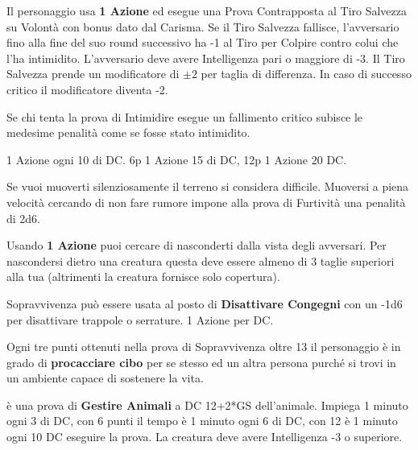 \documentclass[landscape,10pt,a4paper]{article}
\begin{document}
\begin{multicols}{3}
\begin{dmbox}[title=Intimidire - pagina \pageref{intimidire}]
Il personaggio usa \textbf{1 Azione} ed esegue una Prova Contrapposta al Tiro Salvezza su Volontà con bonus dato dal Carisma.
Se il Tiro Salvezza fallisce, l'avversario fino alla fine del suo round successivo ha -1 al Tiro per Colpire contro colui che l'ha intimidito. L'avversario deve avere Intelligenza pari o maggiore di -3. Il Tiro Salvezza prende un modificatore di $\pm2$ per taglia di differenza. In caso di successo critico il modificatore diventa -2. 

Se chi tenta la prova di Intimidire esegue un fallimento critico subisce le medesime penalità come se fosse stato intimidito.
\end{dmbox}


\begin{dmbox}[title=Artista della Fuga - pagina \pageref{artistadellafuga}]
	1 Azione ogni 10 di DC. 6p 1 Azione 15 di DC, 12p 1 Azione 20 DC.
\end{dmbox}

\begin{dmbox}[title=Furtività - pagina \pageref{furtivita}]
Se vuoi muoverti silenziosamente il terreno si considera difficile. Muoversi a piena velocità cercando di non fare rumore impone alla prova di Furtività una penalità di 2d6.

Usando \textbf{1 Azione} puoi cercare di nasconderti dalla vista degli avversari. Per nascondersi dietro una creatura questa deve essere almeno di 3 taglie superiori alla tua (altrimenti la creatura fornisce solo copertura).
\end{dmbox}


\begin{dmbox}[title=Sopravvivenza - pagina \pageref{sopravvivenza}]
Sopravvivenza può essere usata al posto di \textbf{Disattivare Congegni} con un -1d6 per disattivare trappole o serrature. 1 Azione per DC.

Ogni tre punti ottenuti nella prova di Sopravvivenza oltre 13 il personaggio è in grado di \textbf{procacciare cibo} per se stesso ed un altra persona purché si trovi in un ambiente capace di sostenere la vita.
\end{dmbox}

\begin{dmbox}[title=Gestire Animali - Ammansire un animale - pagina \pageref{gestireanimali}]
è una prova di \textbf{Gestire Animali} a DC 12+2*GS dell'animale. Impiega 1 minuto ogni 3 di DC, con 6 punti il tempo è 1 minuto ogni 6 di DC, con 12 è 1 minuto ogni 10 DC eseguire la prova. La creatura deve avere Intelligenza -3 o superiore.
\end{dmbox}


\end{multicols}
\end{document}
